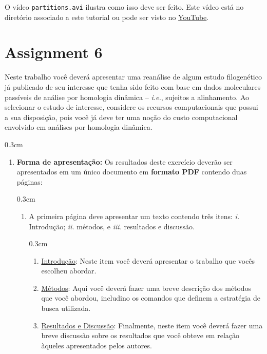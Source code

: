 \begin{refsection}
O vídeo \texttt{partitions.avi} ilustra como isso deve ser feito. Este vídeo está no diretório associado a este tutorial ou pode ser visto no  \href{http://youtu.be/SeFRVRyBNbk}{YouTube}.\\


\section{Assignment 6}\label{tut11:assigment}

Neste trabalho você deverá apresentar uma reanálise de algum estudo filogenético já publicado de seu interesse que tenha sido feito com base em dados moleculares passíveis de análise por homologia dinâmica -- \textit{i.e.}, sujeitos a alinhamento. Ao selecionar o estudo de interesse, considere os recursos computacionais que possui a sua disposição, pois você já deve ter uma noção do custo computacional envolvido em análises por homologia dinâmica. 

\begin {myindentpar}{0.3cm}
\begin{enumerate}[\itshape a.]

 \item{\textbf{Forma de apresentação:}} Os resultados deste exercício deverão ser apresentados em um único documento em \textbf{formato PDF} contendo duas páginas:

    \begin {myindentpar}{0.3cm}
    \begin{enumerate}[\itshape 1.]
    \item{A primeira página deve apresentar um texto contendo três itens: \textit{i.} Introdução; \textit{ii.} métodos, e \textit{iii.} resultados e discussão.} 

	\begin {myindentpar}{0.3cm}
	\begin{enumerate}[\itshape i.]
		\item{\underline{Introdução}:} Neste item você deverá apresentar o trabalho que vocês escolheu abordar.\\
		\item{\underline{Métodos}:} Aqui você deverá fazer uma breve descrição dos métodos que você abordou, includino os comandos que definem a estratégia de busca utilizada.\\
		\item{\underline{Resultados e Discussão}:}  Finalmente, neste item você deverá fazer uma breve discussão sobre os resultados que você obteve em relação àqueles apresentados pelos autores.\\
	\end{enumerate}
	\end{myindentpar}


\end{enumerate}
\end{myindentpar}
\end{enumerate}
\end{myindentpar}
\end{refsection}
